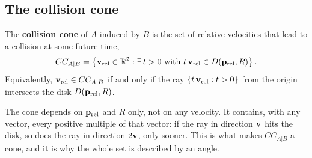 \subsection{The collision cone}

\begin{definition}
\label{def:ch12-collision-cone}
The \textbf{collision cone} of $A$ induced by $B$ is
the set of relative velocities that lead to a collision at some future time,
\begin{equation}
  CC_{A|B} = \left\{ \mathbf{v}_{\mathrm{rel}} \in \mathbb{R}^2 :
    \exists\, t > 0 \ \text{with}\
    t\,\mathbf{v}_{\mathrm{rel}} \in D(\mathbf{p}_{\mathrm{rel}},R) \right\}.
  \label{eq:ch12-cc}
\end{equation}
Equivalently, $\mathbf{v}_{\mathrm{rel}} \in CC_{A|B}$ if and only if the ray
$\left\{ t\,\mathbf{v}_{\mathrm{rel}} : t > 0 \right\}$ from the origin intersects the disk
$D(\mathbf{p}_{\mathrm{rel}},R)$.
\end{definition}

The cone depends on $\mathbf{p}_{\mathrm{rel}}$ and $R$ only, not on any velocity.
It contains, with any vector, every positive multiple of that vector: if the
ray in direction $\mathbf{v}$ hits the disk, so does the ray in direction $2\mathbf{v}$,
only sooner. This is what makes $CC_{A|B}$ a cone, and it is why the whole set
is described by an angle.

